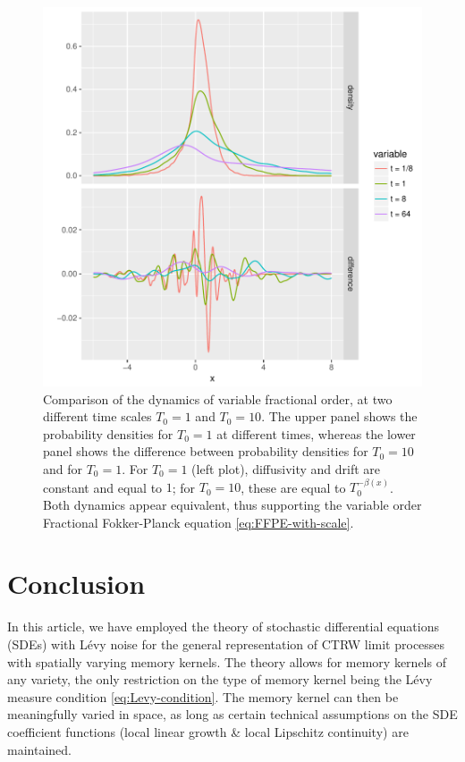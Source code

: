 \documentclass[a4paper,12pt]{elsarticle}
\numberwithin{equation}{section}
\theoremstyle{plain}
\theoremstyle{definition}
\theoremstyle{remark}
\numberwithin{equation}{section}
\newcommand{\1}{\mathbf 1}
\begin{document}
\begin{figure}[h]
\centering
\includegraphics{densities.pdf}
\caption{\label{fig:comparison}Comparison of the dynamics of variable fractional order, at two different time scales $T_0 = 1$ and $T_0 = 10$. The upper panel shows the probability densities for $T_0 = 1$ at different times, whereas the lower panel shows the difference between probability densities for $T_0 = 10$ and for $T_0 = 1$. For $T_0 = 1$ (left plot), diffusivity and drift are constant and equal to $1$; for $T_0 = 10$, these are equal to $T_0^{-\beta(x)}$. Both dynamics appear equivalent, thus supporting the variable order Fractional Fokker-Planck equation \eqref{eq:FFPE-with-scale}.}
\end{figure}


\section{Conclusion}

In this article, we have employed the theory of stochastic differential equations (SDEs) with
L\'evy noise for the general representation of CTRW limit processes with spatially varying memory kernels.  The theory allows for memory kernels of any variety, 
the only restriction on the type of memory kernel being the L\'evy measure condition \eqref{eq:Levy-condition}.  The memory kernel can then be meaningfully varied in space, as long as certain technical assumptions on the SDE coefficient functions (local linear growth \& local Lipschitz continuity) are maintained.  
\end{document}
